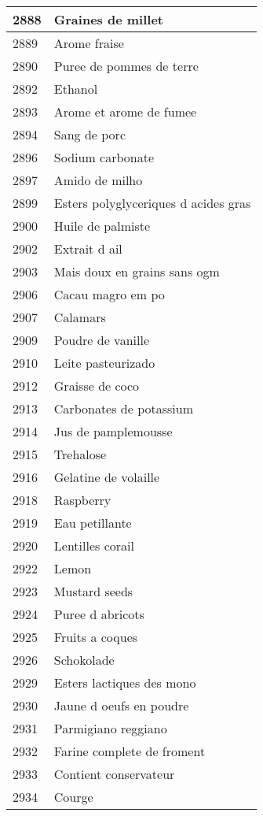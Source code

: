 \begin{longtable}{|l|l|}
2888 & Graines de millet \\ \hline 
2889 & Arome fraise \\ \hline 
2890 & Puree de pommes de terre \\ \hline 
2892 & Ethanol \\ \hline 
2893 & Arome et arome de fumee \\ \hline 
2894 & Sang de porc \\ \hline 
2896 & Sodium carbonate \\ \hline 
2897 & Amido de milho \\ \hline 
2899 & Esters polyglyceriques d acides gras \\ \hline 
2900 & Huile de palmiste \\ \hline 
2902 & Extrait d ail \\ \hline 
2903 & Mais doux en grains sans ogm \\ \hline 
2906 & Cacau magro em po \\ \hline 
2907 & Calamars \\ \hline 
2909 & Poudre de vanille \\ \hline 
2910 & Leite pasteurizado \\ \hline 
2912 & Graisse de coco \\ \hline 
2913 & Carbonates de potassium \\ \hline 
2914 & Jus de pamplemousse \\ \hline 
2915 & Trehalose \\ \hline 
2916 & Gelatine de volaille \\ \hline 
2918 & Raspberry \\ \hline 
2919 & Eau petillante \\ \hline 
2920 & Lentilles corail \\ \hline 
2922 & Lemon \\ \hline 
2923 & Mustard seeds \\ \hline 
2924 & Puree d abricots \\ \hline 
2925 & Fruits a coques \\ \hline 
2926 & Schokolade \\ \hline 
2929 & Esters lactiques des mono \\ \hline 
2930 & Jaune d oeufs en poudre \\ \hline 
2931 & Parmigiano reggiano \\ \hline 
2932 & Farine complete de froment \\ \hline 
2933 & Contient conservateur \\ \hline 
2934 & Courge \\ \hline 

\end{longtable}
